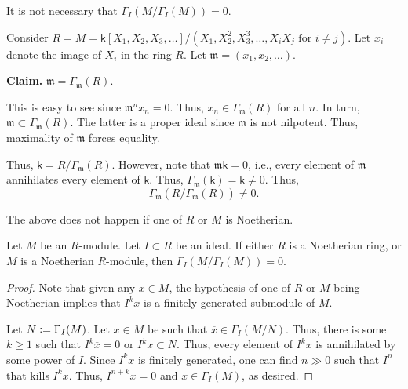 \begin{ex} \label{ex:polynomial-infinite-counterexample}
	It is not necessary that $\Gamma_{I}(M/\Gamma_{I}(M)) = 0$. 

	Consider $R = M = \mathsf{k}[X_{1}, X_{2}, X_{3}, \ldots]/(X_{1}, X_{2}^{2}, X_{3}^{3}, \ldots, X_{i} X_{j} \text{ for } i \neq j)$. \newline
	Let $x_{i}$ denote the image of $X_{i}$ in the ring $R$. Let $\mathfrak{m} = (x_{1}, x_{2}, \ldots)$. 

	\textbf{Claim.} $\mathfrak{m} = \Gamma_{\mathfrak{m}}(R)$. 

	This is easy to see since $\mathfrak{m}^{n} x_{n} = 0$. Thus, $x_{n} \in \Gamma_{\mathfrak{m}}(R)$ for all $n$. In turn, $\mathfrak{m} \subset \Gamma_{\mathfrak{m}}(R)$. The latter is a proper ideal since $\mathfrak{m}$ is not nilpotent. Thus, maximality of $\mathfrak{m}$ forces equality.

	Thus, $\mathsf{k} = R/\Gamma_{\mathfrak{m}}(R)$. However, note that $\mathfrak{m} \mathsf{k} = 0$, i.e., every element of $\mathfrak{m}$ annihilates every element of $\mathsf{k}$. Thus, $\Gamma_{\mathfrak{m}}(\mathsf{k}) = \mathsf{k} \neq 0$. Thus,
	\begin{equation*} 
		\Gamma_{\mathfrak{m}}(R/\Gamma_{\mathfrak{m}}(R)) \neq 0.
	\end{equation*}
\end{ex}

The above does not happen if one of $R$ or $M$ is Noetherian.

\begin{prop}
	Let $M$ be an $R$-module. Let $I \subset R$ be an ideal. If either $R$ is a Noetherian ring, or $M$ is a Noetherian $R$-module, then $\Gamma_{I}(M/\Gamma_{I}(M)) = 0$.
\end{prop}
\begin{proof} 
	Note that given any $x \in M$, the hypothesis of one of $R$ or $M$ being Noetherian implies that $I^{k} x$ is a finitely generated submodule of $M$. 

	Let $N \vcentcolon= \Gamma_{I}(M)$. Let $x \in M$ be such that $\overline{x} \in \Gamma_{I}(M/N)$. Thus, there is some $k \ge 1$ such that $I^{k} \overline{x} = 0$ or $I^{k} x \subset N$. Thus, every element of $I^{k} x$ is annihilated by some power of $I$. Since $I^{k} x$ is finitely generated, one can find $n \gg 0$ such that $I^{n}$ that kills $I^{k} x$. Thus, $I^{n + k} x = 0$ and $x \in \Gamma_{I}(M)$, as desired.
\end{proof}

